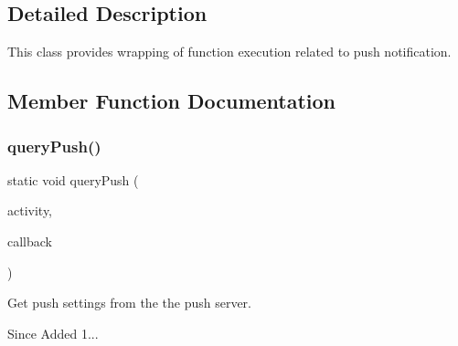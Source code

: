 \subsection{Detailed Description}
This class provides wrapping of function execution related to push notification. 

\subsection{Member Function Documentation}
\mbox{\label{classcom_1_1toast_1_1android_1_1gamebase_1_1_gamebase_1_1_push_a4745e49979a4b9e6867c9361c72e1556}} 
\subsubsection{\texorpdfstring{query\+Push()}{queryPush()}}
{\footnotesize\ttfamily static void query\+Push (\begin{DoxyParamCaption}\item[{@Non\+Null final Activity}]{activity,  }\item[{@Non\+Null final \hyperlink{interfacecom_1_1toast_1_1android_1_1gamebase_1_1_gamebase_data_callback}{Gamebase\+Data\+Callback}$<$ \hyperlink{classcom_1_1toast_1_1android_1_1gamebase_1_1base_1_1push_1_1_push_configuration}{Push\+Configuration} $>$}]{callback }\end{DoxyParamCaption})\hspace{0.3cm}{\ttfamily [static]}}



Get push settings from the the push server. 

\begin{DoxySince}{Since}
Added 1... 
\end{DoxySince}

